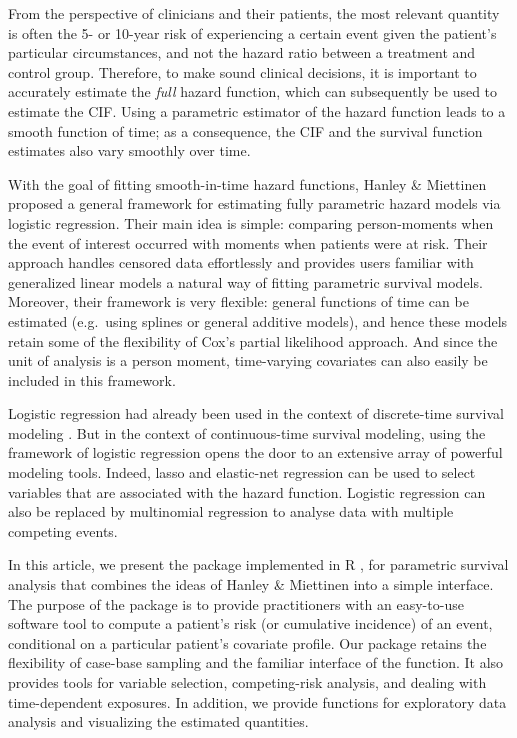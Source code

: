 From the perspective of clinicians and their patients, the most relevant
quantity is often the 5- or 10-year risk of experiencing a certain event
given the patient's particular circumstances, and not the hazard ratio
between a treatment and control group. Therefore, to make sound clinical
decisions, it is important to accurately estimate the \emph{full} hazard
function, which can subsequently be used to estimate the CIF. Using a
parametric estimator of the hazard function leads to a smooth function
of time; as a consequence, the CIF and the survival function estimates
also vary smoothly over time.

With the goal of fitting smooth-in-time hazard functions, Hanley \&
Miettinen \citeyearpar{hanley2009fitting} proposed a general framework
for estimating fully parametric hazard models via logistic regression.
Their main idea is simple: comparing person-moments when the event of
interest occurred with moments when patients were at risk. Their
approach handles censored data effortlessly and provides users familiar
with generalized linear models a natural way of fitting parametric
survival models. Moreover, their framework is very flexible: general
functions of time can be estimated (e.g.~using splines or general
additive models), and hence these models retain some of the flexibility
of Cox's partial likelihood approach. And since the unit of analysis is
a person moment, time-varying covariates can also easily be included in
this framework.

Logistic regression had already been used in the context of
discrete-time survival modeling \citep{cox1972regression}. But in the
context of continuous-time survival modeling, using the framework of
logistic regression opens the door to an extensive array of powerful
modeling tools. Indeed, lasso and elastic-net regression can be used to
select variables that are associated with the hazard function. Logistic
regression can also be replaced by multinomial regression to analyse
data with multiple competing events.

In this article, we present the  package
\citep{casebase-package} implemented in \textsf{R} \citep{r-core}, for
parametric survival analysis that combines the ideas of Hanley \&
Miettinen \citeyearpar{hanley2009fitting} into a simple interface. The
purpose of the  package is to provide practitioners with
an easy-to-use software tool to compute a patient's risk (or cumulative
incidence) of an event, conditional on a particular patient's covariate
profile. Our package retains the flexibility of case-base sampling and
the familiar interface of the  function. It also provides
tools for variable selection, competing-risk analysis, and dealing with
time-dependent exposures. In addition, we provide functions for
exploratory data analysis and visualizing the estimated quantities.

